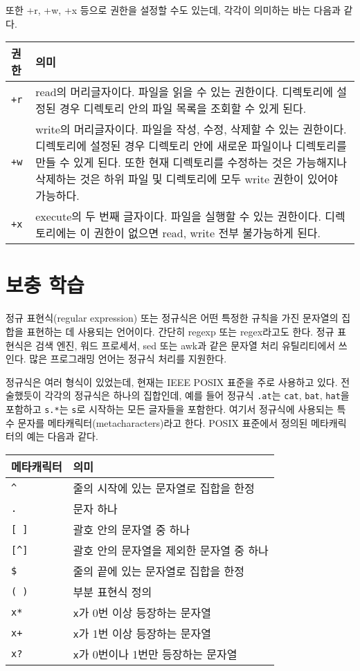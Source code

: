 \documentclass[runningheads]{llncs}
\begin{document}
또한 +r, +w, +x 등으로 권한을 설정할 수도 있는데, 각각이 의미하는 바는 다음과 같다.

\begin{tabularx}{\textwidth}{l|X}
	권한 & 의미 \\
	\hline
	\texttt{+r} & read의 머리글자이다. 파일을 읽을 수 있는 권한이다. 디렉토리에 설정된 경우 디렉토리 안의 파일 목록을 조회할 수 있게 된다. \\
	\texttt{+w} & write의 머리글자이다. 파일을 작성, 수정, 삭제할 수 있는 권한이다. 디렉토리에 설정된 경우 디렉토리 안에 새로운 파일이나 디렉토리를 만들 수 있게 된다. 또한 현재 디렉토리를 수정하는 것은 가능해지나 삭제하는 것은 하위 파일 및 디렉토리에 모두 write 권한이 있어야 가능하다. \\
	\texttt{+x} & execute의 두 번째 글자이다. 파일을 실행할 수 있는 권한이다. 디렉토리에는 이 권한이 없으면 read, write 전부 불가능하게 된다.
\end{tabularx}

\section{보충 학습}
정규 표현식(regular expression) 또는 정규식은 어떤 특정한 규칙을 가진 문자열의 집합을 표현하는 데 사용되는 언어이다. 간단히 regexp 또는 regex라고도 한다. 정규 표현식은 검색 엔진, 워드 프로세서, sed 또는 awk과 같은 문자열 처리 유틸리티에서 쓰인다. 많은 프로그래밍 언어는 정규식 처리를 지원한다.

정규식은 여러 형식이 있었는데, 현재는 IEEE POSIX 표준을 주로 사용하고 있다. 전술했듯이 각각의 정규식은 하나의 집합인데, 예를 들어 정규식 \texttt{.at}는 \texttt{cat}, \texttt{bat}, \texttt{hat}을 포함하고 \texttt{s.*}는 \texttt{s}로 시작하는 모든 글자들을 포함한다. 여기서 정규식에 사용되는 특수 문자를 메타캐릭터(metacharacters)라고 한다. POSIX 표준에서 정의된 메타캐릭터의 예는 다음과 같다.

\begin{tabularx}{\textwidth}{l|X}
	메타캐릭터 & 의미 \\
	\hline
	\texttt{\textasciicircum} & 줄의 시작에 있는 문자열로 집합을 한정 \\
	\texttt{.} & 문자 하나 \\
	\texttt{[ ]} & 괄호 안의 문자열 중 하나 \\
	\texttt{[\textasciicircum\space]} & 괄호 안의 문자열을 제외한 문자열 중 하나 \\
	\texttt{\$} & 줄의 끝에 있는 문자열로 집합을 한정 \\
	\texttt{( )} & 부분 표현식 정의 \\
	\texttt{x*} & \texttt{x}가 0번 이상 등장하는 문자열 \\
	\texttt{x+} & \texttt{x}가 1번 이상 등장하는 문자열 \\
	\texttt{x?} & \texttt{x}가 0번이나 1번만 등장하는 문자열 \\
\end{tabularx}
\end{document}
